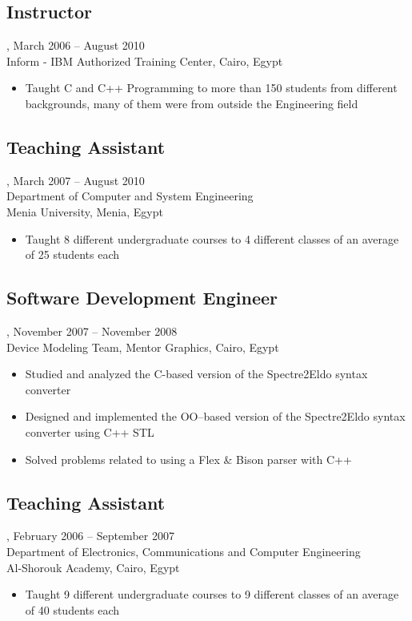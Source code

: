 \subsection{Instructor}, March 2006 -- August 2010\\
Inform - IBM Authorized Training Center, Cairo, Egypt
\begin{itemize}
\item Taught C and C++ Programming to more than 150 students from different backgrounds, many of them were from outside the Engineering field
\end{itemize}

\subsection{Teaching Assistant}, March 2007 -- August 2010\\
Department of Computer and System Engineering\\
Menia University, Menia, Egypt
\begin{itemize}
\item Taught 8 different undergraduate courses to 4 different classes of an average of 25 students each
\end{itemize}

\subsection{Software Development Engineer}, November 2007 -- November 2008\\
Device Modeling Team, Mentor Graphics, Cairo, Egypt
\begin{itemize}
\item Studied and analyzed the C-based version of the Spectre2Eldo syntax converter
\item Designed and implemented the OO--based version of the Spectre2Eldo syntax converter using C++ STL
\item Solved problems related to using a Flex \& Bison parser with C++
\end{itemize}

\subsection{Teaching Assistant}, February 2006 -- September 2007\\
Department of Electronics, Communications and Computer Engineering\\
Al-Shorouk Academy, Cairo, Egypt
\begin{itemize}
\item Taught 9 different undergraduate courses to 9 different classes of an average of 40 students each
\end{itemize}

